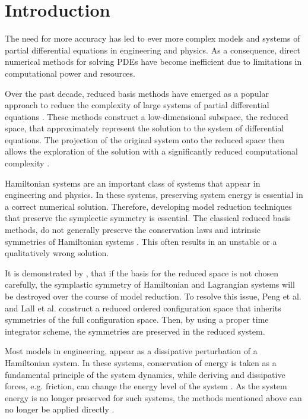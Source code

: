 \section{Introduction} \label{sec:1}

The need for more accuracy has led to ever more complex models and systems of partial differential equations in engineering and physics. As a consequence, direct numerical methods for solving PDEs have become inefficient due to limitations in computational power and resources.

Over the past decade, reduced basis methods have emerged as a popular approach to reduce the complexity of large systems of partial differential equations \cite{Ito:1998up,Ito:1998ch,Ito:2001ev}. These methods construct a low-dimensional subspace, the reduced space, that approximately represent the solution to the system of differential equations. The projection of the original system onto the reduced space then allows the exploration of the solution with a significantly reduced computational complexity \cite{hesthaven2015certified,quarteroni2015reduced}.

Hamiltonian systems are an important class of systems that appear in engineering and physics. In these systems, preserving system energy is essential in a correct numerical solution. Therefore, developing model reduction techniques that preserve the symplectic symmetry is essential. The classical reduced basis methods, do not generally preserve the conservation laws and intrinsic symmetries of Hamiltonian systems \cite{Amsallem:2014ef,prajna2003pod}. This often results in an unstable or a qualitatively wrong solution. 

It is demonstrated by \cite{Lall:2003iy,Carlberg:2014ky,Peng:2014di}, that if the basis for the reduced space is not chosen carefully, the symplastic symmetry of Hamiltonian and Lagrangian systems will be destroyed over the course of model reduction. To resolve this issue, Peng et al. \cite{Peng:2014di} and Lall et al. \cite{Lall:2003iy} construct a reduced ordered configuration space that inherits symmetries of the full configuration space. Then, by using a proper time integrator scheme, the symmetries are preserved in the reduced system.

Most models in engineering, appear as a dissipative perturbation of a Hamiltonian system. In these systems, conservation of energy is taken as a fundamental principle of the system dynamics, while deriving and dissipative forces, e.g. friction, can change the energy level of the system \cite{vanderSchaft:2014:PST:2693645.2693646}. As the system energy is no longer preserved for such systems, the methods mentioned above can no longer be applied directly \cite{peng2016geometric}.

